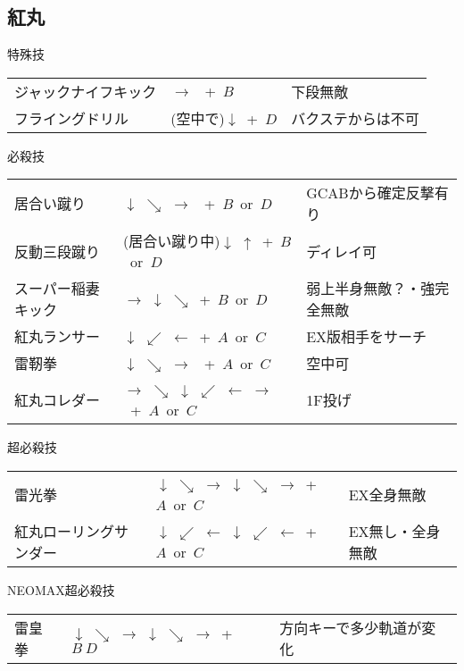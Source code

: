 \documentclass[a4j,11pt]{jarticle}
\begin{document}
\subsection{紅丸}
\begin{itembox}[l]{特殊技}
\begin{tabular}{lll}
ジャックナイフキック&$\rightarrow$ \ +\ $B$&下段無敵\\
フライングドリル&(空中で)$\downarrow$\ +\ $D$&バクステからは不可
\end{tabular}
\end{itembox}
\begin{itembox}[l]{必殺技}
\begin{tabular}{lll}
居合い蹴り&$\downarrow$ $\searrow$ $\rightarrow$ \ +\ $B$\ or\ $D$&GCABから確定反撃有り\\
反動三段蹴り&(居合い蹴り中)$\downarrow$ $\uparrow$\ +\ $B$\ or\ $D$&ディレイ可\\
スーパー稲妻キック&$\rightarrow$ $\downarrow$ $\searrow$\ +\ $B$\ or\ $D$&弱上半身無敵？・強完全無敵\\
紅丸ランサー&$\downarrow$ $\swarrow$ $\leftarrow$\ +\ $A$\ or\ $C$&EX版相手をサーチ\\
雷靭拳&$\downarrow$ $\searrow$ $\rightarrow$ \ +\ $A$\ or\ $C$&空中可\\
紅丸コレダー&$\rightarrow$ $\searrow$ $\downarrow$ $\swarrow$ $\leftarrow$ $\rightarrow$\ +\ $A$\ or\ $C$&1F投げ
\end{tabular}
\end{itembox}
\begin{itembox}[l]{超必殺技}
\begin{tabular}{lll}
雷光拳&$\downarrow$ $\searrow$ $\rightarrow$ $\downarrow$ $\searrow$ $\rightarrow$\ +\ $A$\ or\ $C$&EX全身無敵\\
紅丸ローリングサンダー&$\downarrow$ $\swarrow$ $\leftarrow$ $\downarrow$ $\swarrow$ $\leftarrow$\ +\ $A$\ or\ $C$&EX無し・全身無敵
\end{tabular}
\end{itembox}
\begin{itembox}[l]{NEOMAX超必殺技}
\begin{tabular}{lll}
雷皇拳&$\downarrow$ $\searrow$ $\rightarrow$ $\downarrow$ $\searrow$ $\rightarrow$\ +\ $B\ D$&方向キーで多少軌道が変化
\end{tabular}
\end{itembox}
\newpage
\end{document}
